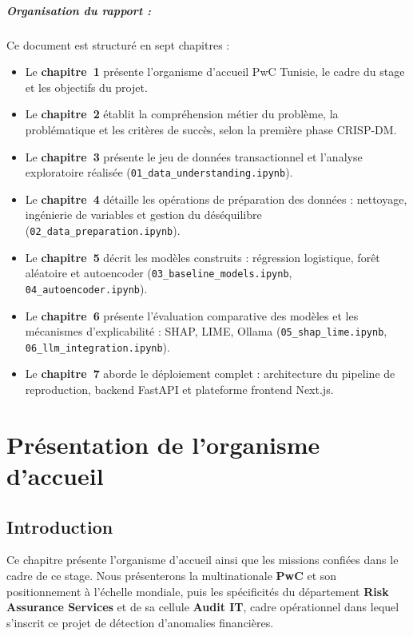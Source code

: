 \documentclass[12pt,a4paper,twoside]{report}
\begin{document}
\paragraph{Organisation du rapport :} Ce document est structuré en sept chapitres :
\begin{itemize}
  \item Le \textbf{chapitre~1} présente l'organisme d'accueil PwC Tunisie, le cadre du stage et les objectifs du projet.
  \item Le \textbf{chapitre~2} établit la compréhension métier du problème, la problématique et les critères de succès, selon la première phase CRISP-DM.
  \item Le \textbf{chapitre~3} présente le jeu de données transactionnel et l'analyse exploratoire réalisée (\texttt{01\_data\_understanding.ipynb}).
  \item Le \textbf{chapitre~4} détaille les opérations de préparation des données : nettoyage, ingénierie de variables et gestion du déséquilibre (\texttt{02\_data\_preparation.ipynb}).
  \item Le \textbf{chapitre~5} décrit les modèles construits : régression logistique, forêt aléatoire et autoencoder (\texttt{03\_baseline\_models.ipynb}, \texttt{04\_autoencoder.ipynb}).
  \item Le \textbf{chapitre~6} présente l'évaluation comparative des modèles et les mécanismes d'explicabilité : SHAP, LIME, Ollama (\texttt{05\_shap\_lime.ipynb}, \texttt{06\_llm\_integration.ipynb}).
  \item Le \textbf{chapitre~7} aborde le déploiement complet : architecture du pipeline de reproduction, backend FastAPI et plateforme frontend Next.js.
\end{itemize}

\chapter{Présentation de l'organisme d'accueil}

\section*{Introduction}

Ce chapitre présente l'organisme d'accueil ainsi que les missions confiées dans le cadre de ce stage. Nous présenterons la multinationale \textbf{PwC} et son positionnement à l'échelle mondiale, puis les spécificités du département \textbf{Risk Assurance Services} et de sa cellule \textbf{Audit IT}, cadre opérationnel dans lequel s'inscrit ce projet de détection d'anomalies financières.
\end{document}
